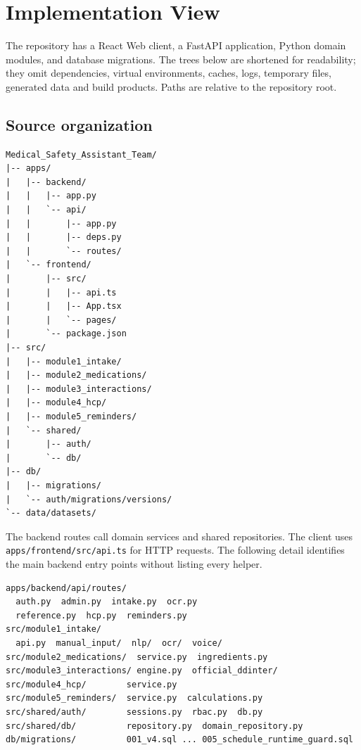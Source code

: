 \documentclass[10pt,letterpaper]{article}
\newenvironment{updated}{\par\color{pafourblue}}{\par}
\newcommand{\sourcefile}[1]{\nolinkurl{#1}}
\begin{document}
\section{Implementation View}
\label{sec:implementation-view}
\begin{updated}
The repository has a React Web client, a FastAPI application, Python domain
modules, and database migrations. The trees below are shortened for readability;
they omit dependencies, virtual environments, caches, logs, temporary files,
generated data and build products. Paths are relative to the repository root.

\subsection{Source organization}
\begingroup\small
\begin{verbatim}
Medical_Safety_Assistant_Team/
|-- apps/
|   |-- backend/
|   |   |-- app.py
|   |   `-- api/
|   |       |-- app.py
|   |       |-- deps.py
|   |       `-- routes/
|   `-- frontend/
|       |-- src/
|       |   |-- api.ts
|       |   |-- App.tsx
|       |   `-- pages/
|       `-- package.json
|-- src/
|   |-- module1_intake/
|   |-- module2_medications/
|   |-- module3_interactions/
|   |-- module4_hcp/
|   |-- module5_reminders/
|   `-- shared/
|       |-- auth/
|       `-- db/
|-- db/
|   |-- migrations/
|   `-- auth/migrations/versions/
`-- data/datasets/
\end{verbatim}
\endgroup

The backend routes call domain services and shared repositories. The client
uses \sourcefile{apps/frontend/src/api.ts} for HTTP requests. The following
detail identifies the main backend entry points without listing every helper.

\begingroup\small
\begin{verbatim}
apps/backend/api/routes/
  auth.py  admin.py  intake.py  ocr.py
  reference.py  hcp.py  reminders.py
src/module1_intake/
  api.py  manual_input/  nlp/  ocr/  voice/
src/module2_medications/  service.py  ingredients.py
src/module3_interactions/ engine.py  official_ddinter/
src/module4_hcp/        service.py
src/module5_reminders/  service.py  calculations.py
src/shared/auth/        sessions.py  rbac.py  db.py
src/shared/db/          repository.py  domain_repository.py
db/migrations/          001_v4.sql ... 005_schedule_runtime_guard.sql
\end{verbatim}
\endgroup

\clearpage

\end{updated}
\end{document}
